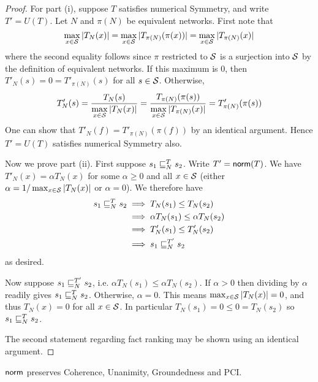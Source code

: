 \begin{proof}
For part (i), suppose $T$ satisfies numerical Symmetry, and write $T' = U(T)$. Let $N$ and
$\pi(N)$ be equivalent networks. First note that
\[
    \max_{x \in \S}{|T_N(x)|}
    = \max_{x \in \S}{|T_{\pi(N)}(\pi(x))}|
    = \max_{x \in \S}{|T_{\pi(N)}(x)|}
\]
where the second equality follows since $\pi$ restricted to $\S$ is a
surjection into $\S$ by the definition of equivalent networks. If this maximum
is 0, then $T'_N(s)=0=T'_{\pi(N)}(s)$ for all $s \in \S$. Otherwise,
\[
    T'_N(s)
    = \frac{T_N(s)}{\max\limits_{x \in \S}{|T_N(x)|}}
    = \frac{T_{\pi(N)}(\pi(s))}{\max\limits_{x \in \S}{|T_{\pi(N)}(x)|}}
    = T'_{\pi(N)}(\pi(s))
\]
One can show that $T'_N(f) = T'_{\pi(N)}(\pi(f))$ by an identical argument.
Hence $T'=U(T)$ satisfies numerical Symmetry also.

Now we prove part (ii). First suppose $s_1 \sle_N^T s_2$. Write $T' =
\norm(T)$. We have $T'_N(x) = \alpha T_N(x)$ for some $\alpha \ge 0$ and all $x
\in \S$ (either $\alpha = 1 / \max_{x \in \S}{|T_N(x)|}$ or $\alpha = 0$). We
therefore have
\begin{align*}
    s_1 \sle_N^T s_2
    & \implies T_N(s_1) \le T_N(s_2) \\
    & \implies \alpha T_N(s_1) \le \alpha T_N(s_2) \\
    & \implies T'_N(s_1) \le T'_N(s_2) \\
    & \implies s_1 \sle_N^{T'} s_2
\end{align*}
as desired.

Now suppose $s_1 \sle_N^{T'} s_2$, i.e. $\alpha T_N(s_1) \le \alpha T_N(s_2)$.
If $\alpha > 0$ then dividing by $\alpha$ readily gives $s_1 \sle_N^T s_2$.
Otherwise, $\alpha = 0$. This means $\max_{x \in \S}{|T_N(x)|} = 0$, and thus
$T_N(x) = 0$ for all $x \in \S$. In particular $T_N(s_1) = 0 \le 0 = T_N(s_2)$
so $s_1 \sle_N^T s_2$.

The second statement regarding fact ranking may be shown using an identical
argument.
\end{proof}

\begin{corollary}
\label{td_cor_norm_preservation}
$\norm$ preserves Coherence, Unanimity, Groundedness and PCI.
\end{corollary}

